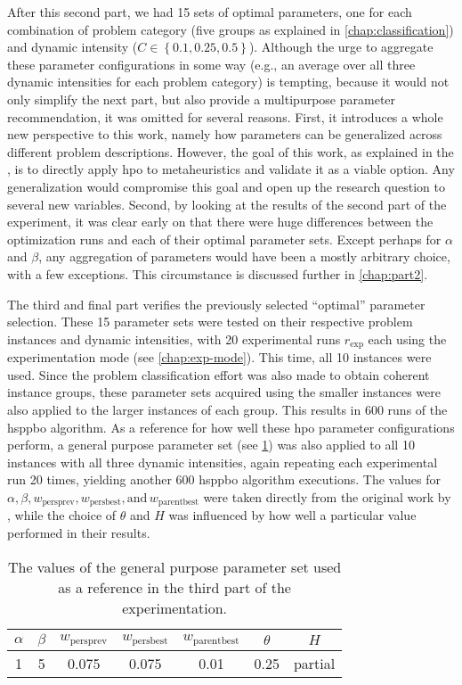 After this second part, we had 15 sets of optimal parameters, one for each combination of problem category (five groups as explained in \cref{chap:classification}) and dynamic intensity ($C \in \left\lbrace 0.1,0.25,0.5\right\rbrace$). Although the urge to aggregate these parameter configurations in some way (e.g., an average over all three dynamic intensities for each problem category) is tempting, because it would not only simplify the next part, but also provide a multipurpose parameter recommendation, it was omitted for several reasons. First, it introduces a whole new perspective to this work, namely how parameters can be generalized across different problem descriptions. However, the goal of this work, as explained in the , is to directly apply \glsdesc{hpo} to metaheuristics and validate it as a viable option. Any generalization would compromise this goal and open up the research question to several new variables. Second, by looking at the results of the second part of the experiment, it was clear early on that there were huge differences between the optimization runs and each of their optimal parameter sets. Except perhaps for $\alpha$ and $\beta$, any aggregation of parameters would have been a mostly arbitrary choice, with a few exceptions. This circumstance is discussed further in \cref{chap:part2}.

The third and final part verifies the previously selected \enquote{optimal} parameter selection. These 15 parameter sets were tested on their respective problem instances and dynamic intensities, with 20 experimental runs $r_\text{exp}$ each using the experimentation mode (see \cref{chap:exp-mode}). This time, all 10 instances were used. Since the problem classification effort was also made to obtain coherent instance groups, these parameter sets acquired using the smaller instances were also applied to the larger instances of each group. This results in 600 runs of the \gls{hsppbo} algorithm.
As a reference for how well these \gls{hpo} parameter configurations perform, a general purpose parameter set (see \cref{tab:part3-gen-params}) was also applied to all 10 instances with all three dynamic intensities, again repeating each experimental run 20 times, yielding another 600 \gls{hsppbo} algorithm executions.
The values for $\alpha, \beta, w_{\text{persprev}}, w_{\text{persbest}}, \text{and} \, w_{\text{parentbest}}$ were taken directly from the original work by \citet{kupfer2021hierarchical}, while the choice of $\theta$ and $H$ was influenced by how well a particular value performed in their results.
\begin{table}
	\centering
	\caption{The values of the general purpose parameter set used as a reference in the third part of the experimentation.}
	\label{tab:part3-gen-params}
	
	\begin{tabular}{c|c|c|c|c|c|c}
		$\alpha$ & $\beta$ & $w_{\text{persprev}}$ & $w_{\text{persbest}}$& $w_{\text{parentbest}}$ & $\theta$ & $H$ \\
		\hline
		1 & 5 & 0.075 & 0.075 & 0.01 & 0.25 & partial \\
	\end{tabular}
\end{table}

